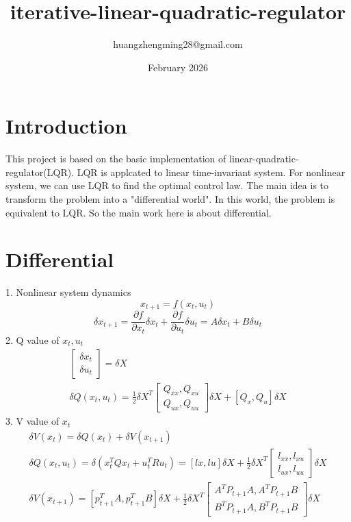 \documentclass{article}
\title{iterative-linear-quadratic-regulator}
\author{huangzhengming28@gmail.com}
\date{February 2026}
\begin{document}
\maketitle

\section{Introduction}
This project is based on the basic implementation of linear-quadratic-regulator(LQR). LQR is applcated to linear time-invariant system. For nonlinear system, we can use LQR to find the optimal control law. The main idea is to transform the problem into a "differential world". In this world, the problem is equivalent to LQR. So the main work here is about differential.

\section{Differential}
1. Nonlinear system dynamics
\begin{equation}
    x_{t+1} = f(x_t, u_t)
\end{equation}
\begin{equation}
    \delta{x_{t+1}} = \frac{\partial{f}}{\partial{x_t}} \delta{x_t} + \frac{\partial{f}}{\partial{u_t}} \delta{u_t} = A \delta{x_t} + B \delta{u_t}
\end{equation}
2. Q value of $x_t, u_t$
\begin{gather}
    \begin{bmatrix}
        \delta{x_t}\\
        \delta{u_t}
    \end{bmatrix} = \delta{X}\\
    \delta{Q(x_t, u_t)} = \frac{1}{2} \delta{X}^T \begin{bmatrix}Q_{xx}, Q_{xu}\\Q_{ux}, Q_{uu} \end{bmatrix} \delta{X} + [Q_x, Q_u] \delta{X} \label{q_value_function}
\end{gather}
3. V value of $x_t$
\begin{gather}
    \delta{V(x_{t})} = \delta{Q(x_{t})} + \delta{V(x_{t+1})}\\
    \delta{Q(x_{t}, u_t)} = \delta(x_t^T Q x_t + u_t^T R u_t)=[lx, lu]\delta{X} + \frac{1}{2} \delta{X}^T \begin{bmatrix}
        l_{xx}, l_{xu}\\
        l_{ux}, l_{uu}
    \end{bmatrix} \delta{X}\\
    \delta{V(x_{t+1})} = [p_{t+1}^T A, p_{t+1}^T B] \delta{X} + \frac{1}{2} \delta{X}^T \begin{bmatrix}
        A^T P_{t+1} A, A^T P_{t+1} B\\
        B^T P_{t+1} A, B^T P_{t+1} B
    \end{bmatrix} \delta{X}
\end{gather}
\end{document}
